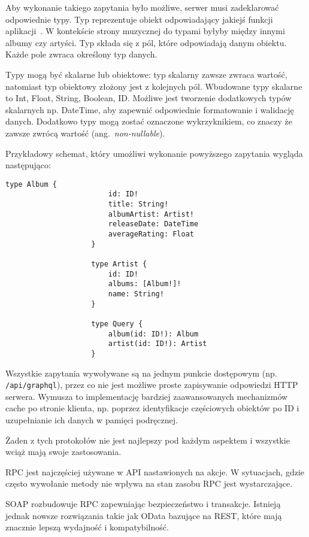 \begin{description}
				Aby wykonanie takiego zapytania było możliwe, serwer musi zadeklarować odpowiednie typy.
				Typ reprezentuje obiekt odpowiadający jakiejś funkcji aplikacji~\cite{GraphQL}.
				W kontekście strony muzycznej do typami byłyby między innymi albumy czy artyści.
				Typ składa się z pól, które odpowiadają danym obiektu.
				Każde pole zwraca określony typ danych.

				Typy mogą być skalarne lub obiektowe: typ skalarny zawsze zwraca wartość, natomiast typ obiektowy złożony jest z kolejnych pól.
				Wbudowane typy skalarne to Int, Float, String, Boolean, ID.
				Możliwe jest tworzenie dodatkowych typów skalarnych np. DateTime, aby zapewnić odpowiednie formatowanie i walidację danych.
				Dodatkowo typy mogą zostać oznaczone wykrzyknikiem, co znaczy że zawsze zwrócą wartość (ang.\ \emph{non-nullable}).
				
				Przykładowy schemat, który umożliwi wykonanie powyższego zapytania wygląda następująco:
				
				\begin{lstlisting}[label=lst:gqlSchema]
					type Album {
						id: ID!
						title: String!
						albumArtist: Artist!
						releaseDate: DateTime
						averageRating: Float
					}

					type Artist {
						id: ID!
						albums: [Album!]!
						name: String!
					}

					type Query {
						album(id: ID!): Album
						artist(id: ID!): Artist
					}
				\end{lstlisting}

				Wszystkie zapytania wywoływane są na jednym punkcie dostępowym (np. \verb|/api/graphql|),
				przez co nie jest możliwe proste zapisywanie odpowiedzi HTTP serwera.
				Wymusza to implementację bardziej zaawansowanych mechanizmów cache po stronie klienta,
				np. poprzez identyfikacje częściowych obiektów po ID i uzupełnianie ich danych w pamięci podręcznej.
		\end{description}

		Żaden z tych protokołów nie jest najlepszy pod każdym aspektem i wszystkie wciąż mają swoje zastosowania.
		
		RPC jest najczęściej używane w API nastawionych na akcje.
		W sytuacjach, gdzie często wywołanie metody nie wpływa na stan zasobu RPC jest wystarczające.

		SOAP rozbudowuje RPC zapewniając bezpieczeństwo i transakcje.
		Istnieją jednak nowsze rozwiązania takie jak OData bazujące na REST, które mają znacznie lepszą wydajność i kompatybilność.

